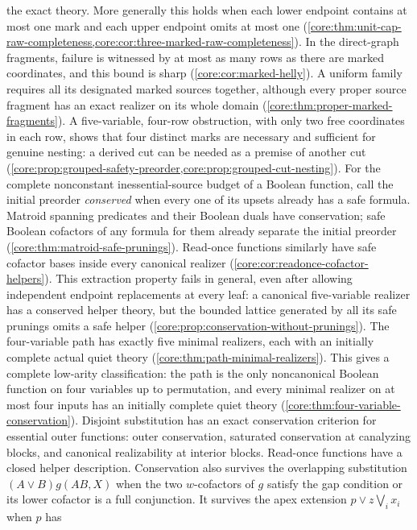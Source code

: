 the exact theory. More generally this holds when each lower endpoint
contains at most one mark and each upper endpoint omits at most one
(\cref{core:thm:unit-cap-raw-completeness,core:cor:three-marked-raw-completeness}).
In the direct-graph fragments, failure is witnessed by at most as many
rows as there are marked coordinates, and this bound is sharp
(\cref{core:cor:marked-helly}). A uniform family requires all its
designated marked sources together, although every proper source fragment
has an exact realizer on its whole domain
(\cref{core:thm:proper-marked-fragments}).
A five-variable, four-row obstruction, with only two free
coordinates in each row, shows that four distinct marks are necessary
and sufficient for genuine nesting: a derived cut can be needed
as a premise of another cut
(\cref{core:prop:grouped-safety-preorder,core:prop:grouped-cut-nesting}).
For the complete nonconstant inessential-source budget of a Boolean
function, call the initial preorder \emph{conserved} when every one of its
upsets already has a safe formula. Matroid spanning predicates and their
Boolean duals have conservation; safe Boolean cofactors of any formula
for them already separate the initial preorder
(\cref{core:thm:matroid-safe-prunings}). Read-once functions similarly
have safe cofactor bases inside every canonical realizer
(\cref{core:cor:readonce-cofactor-helpers}).
This extraction property fails in general, even after allowing independent
endpoint replacements at every leaf: a canonical five-variable realizer
has a conserved helper theory, but the bounded lattice generated by all
its safe prunings omits a safe helper
(\cref{core:prop:conservation-without-prunings}).
The four-variable path has exactly five minimal realizers, each with an
initially complete actual quiet theory
(\cref{core:thm:path-minimal-realizers}). This gives a complete low-arity
classification: the path is the only noncanonical Boolean function on
four variables up to permutation, and every minimal realizer on at most
four inputs has an initially complete quiet theory
(\cref{core:thm:four-variable-conservation}). Disjoint substitution has
an exact conservation criterion for essential outer functions: outer
conservation, saturated conservation at canalyzing blocks, and canonical
realizability at interior blocks. Read-once functions have a closed
helper description. Conservation also survives the overlapping substitution
$(A\vee B)g(AB,X)$ when the two $w$-cofactors of $g$ satisfy the gap
condition or its lower cofactor is a full conjunction. It survives the
apex extension $p\lor z\bigvee_i x_i$ when $p$ has
